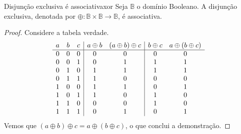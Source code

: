 \begin{lemma}{Disjunção exclusiva é associativa}{xor}
    Seja \(\mathbb{B}\) o domínio Booleano. A disjunção exclusiva, denotada por \(\oplus : \mathbb{B} \times \mathbb{B} \to \mathbb{B}\), é associativa.
\end{lemma}
\begin{proof}
    Considere a tabela verdade.
    \begin{equation*}
        \begin{array}{ c c c | c c | c c}
        a & b & c & a \oplus b & (a \oplus b)\oplus c & b \oplus c &  a \oplus (b \oplus c ) \\
         \hline
        0 & 0 & 0 & 0 & 0 & 0 & 0\\
        0 & 0 & 1 & 0 & 1 & 1 & 1\\
        0 & 1 & 0 & 1 & 1 & 1 & 1\\
        0 & 1 & 1 & 1 & 0 & 0 & 0\\
        1 & 0 & 0 & 1 & 1 & 0 & 1\\
        1 & 0 & 1 & 1 & 0 & 1 & 0\\
        1 & 1 & 0 & 0 & 0 & 1 & 0\\
        1 & 1 & 1 & 0 & 1 & 0 & 1
        \end{array}
    \end{equation*}
    Vemos que \((a \oplus b) \oplus c = a \oplus (b \oplus c)\), o que conclui a demonstração.
\end{proof}


